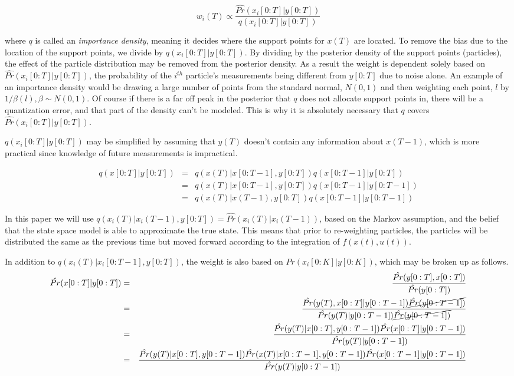 \begin{equation}
w_i(T) \propto \frac{\hat{Pr}(x_i[0:T] | y[0:T])}{q(x_i[0:T] | y[0:T])}
\label{eq:weightfunc}
\end{equation}

where $q$ is called an \emph{importance density}, meaning it decides where
the support points for $x(T)$ are located. To remove the bias due to the
location of the support points, we divide by $q(x_i[0:T] | y[0:T])$. By dividing by 
the posterior density of the support points (particles), the effect of the particle 
distribution may be removed from the posterior density. As a result the weight
is dependent solely based
on $\hat{Pr}(x_i[0:T] | y[0:T])$, the probability of the $i^{th}$ particle's measurements
being different from $y[0:T]$ due to noise alone.
An example of an importance density would be drawing a large
number of points from the standard normal, $N(0,1)$ and then weighting each point, $l$ by 
$1/\beta(l), \beta \sim N(0,1)$. Of course if there is a far off peak in
the posterior that $q$ does not allocate support points in, there will 
be a quantization error, and that part of the density can't be modeled. This is why
it is absolutely necessary that $q$ covers $\hat{Pr}(x_i[0:T] | y[0:T])$.

$q(x_i[0:T] | y[0:T])$ may be simplified by assuming that $y(T)$ doesn't contain 
any information about $x(T-1)$, which is more practical since knowledge of future
measurements is impractical. 

\begin{eqnarray}
q(x[0:T] | y[0:T]) & = & q(x(T) | x[0:T-1], y[0:T])q(x[0:T-1] | y[0:T]) \nonumber \\
& = & q(x(T) | x[0:T-1], y[0:T])q(x[0:T-1] | y[0:T-1]) \nonumber \\
& = & q(x(T) | x(T-1), y[0:T])q(x[0:T-1] | y[0:T-1])
\end{eqnarray}

In this paper we will use 
$q(x_i(T) | x_i(T-1), y[0:T]) =  \hat{Pr}(x_i(T) | x_i(T-1))$,
based on the Markov assumption, and the belief that the state space model is 
able to approximate the true state. This means that prior to re-weighting 
particles, the particles will be distributed the same as the previous time but
moved forward according to the integration of $f(x(t), u(t))$.

In addition to $q(x_i(T) | x_i[0:T-1], y[0:T])$, the weight is also based on $Pr(x_i[0:K] | y[0:K])$,
which may be broken up as follows.
\begin{eqnarray}
\hat{Pr}(x[0:T] | y[0:T]) & = & \frac{\hat{Pr}(y[0:T], x[0:T])}{\hat{Pr}(y[0:T])} \nonumber \\
 & = & \frac{\hat{Pr}(y(T), x[0:T] | y[0:T-1]) \cancel{\hat{Pr}(y[0:T-1])}}{\hat{Pr}(y(T) | y[0:T-1]) \cancel{\hat{Pr}(y[0:T-1])}} \nonumber \\
 & = & \frac{\hat{Pr}(y(T)| x[0:T], y[0:T-1]) \hat{Pr}(x[0:T] | y[0:T-1])}{\hat{Pr}(y(T) | y[0:T-1]) } \nonumber \\
 & = & \frac{\hat{Pr}(y(T)| x[0:T], y[0:T-1]) \hat{Pr}(x(T) | x[0:T-1], y[0:T-1]) \hat{Pr}(x[0:T-1] | y[0:T-1])}{\hat{Pr}(y(T) | y[0:T-1])} \nonumber \\
\end{eqnarray}

